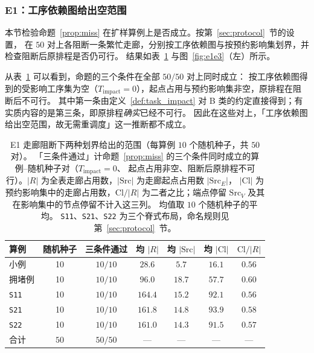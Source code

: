 \documentclass[manuscript,screen,review]{acmart}
\newcommand{\NSeeds}{10}
\newcommand{\NPairs}{50}
\newcommand{\PassMiss}{\NPairs/\NPairs}      %
\begin{document}
\subsubsection{E1：工序依赖图给出空范围}
\label{sec:e1}

本节检验命题~\ref{prop:miss} 在扩样算例上是否成立。按第~\ref{sec:protocol}~节的设置，
在 \(\NPairs\) 对上各阻断一条繁忙走廊，分别按工序依赖图与按预约影响集划界，并检查阻断后原排程是否仍可行。
结果如表~\ref{tab:e1} 与图~\ref{fig:e1e3}（左）所示。

从表~\ref{tab:e1} 可以看到，命题的三个条件在全部 \(\PassMiss\) 对上同时成立：
按工序依赖图得到的受影响工序集为空（\(T_{\mathrm{impact}}=0\)），起点占用与预约影响集非空，原排程在阻断后不可行。
其中第一条由定义~\ref{def:task_impact} 对 B 类的约定直接得到；有实质内容的是第三条，即原排程\emph{确实}已经不可行。
因此在这些对上，「工序依赖图给出空范围，故无需重调度」这一推断都不成立。

\begin{table}[t]
\centering
\caption{E1 走廊阻断下两种划界给出的范围（每算例 \(\NSeeds\) 个随机种子，共 \(\NPairs\) 对）。
「三条件通过」计命题~\ref{prop:miss} 的三个条件同时成立的算例--随机种子对（\(T_{\mathrm{impact}}=0\)、
起点占用非空、阻断后原排程不可行）。\(|R|\) 为全表走廊占用数，\(|\mathrm{Src}|\) 为走廊起点占用数 \(|\mathrm{Src}_E|\)，
\(|\mathrm{Cl}|\) 为预约影响集中的走廊占用数，\(\mathrm{Cl}/|R|\) 为二者之比；端点停留 \(\mathrm{Src}_V\) 及其在影响集中的节点停留不计入这三列。
均值取 \(\NSeeds\) 个随机种子的平均。
\texttt{S11}、\texttt{S21}、\texttt{S22} 为三个脊式布局，命名规则见第~\ref{sec:protocol}~节。}
\label{tab:e1}
\small
\begin{tabular}{@{}lcccccc@{}}
\toprule
算例 & 随机种子 & 三条件通过 & 均 \(|R|\) & 均 \(|\mathrm{Src}|\)
 & 均 \(|\mathrm{Cl}|\) & \(\mathrm{Cl}/|R|\) \\
\midrule
小例   & 10 & \(10/10\) & \(28.6\)  & \(5.7\)  & \(16.1\) & \(0.56\) \\
拥堵例 & 10 & \(10/10\) & \(96.0\) & \(18.7\) & \(57.7\) & \(0.60\) \\
\texttt{S11}  & 10 & \(10/10\) & \(164.4\) & \(15.2\) & \(92.1\) & \(0.56\) \\
\texttt{S21}    & 10 & \(10/10\) & \(161.8\) & \(14.8\) & \(93.9\) & \(0.58\) \\
\texttt{S22}     & 10 & \(10/10\) & \(161.0\) & \(14.3\) & \(91.5\) & \(0.57\) \\
\midrule
合计 & \(\NPairs\) & \(\PassMiss\) & --- & --- & --- & --- \\
\bottomrule
\end{tabular}
\end{table}
\end{document}
